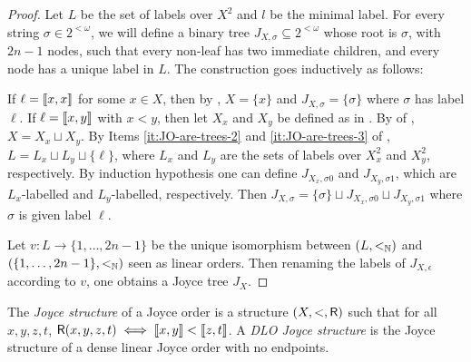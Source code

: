 \begin{proof}
	


Let $L$ be the set of labels over $X^2$ and $l$ be the minimal label. For every string $\sigma \in 2^{<\omega}$, we will define a binary tree $J_{X, \sigma} \subseteq 2^{<\omega}$ whose root is $\sigma$, with $2n-1$ nodes, such that every non-leaf has two immediate children, and every node has a unique label in $L$. The construction goes inductively as follows:

If $\ell = \llbracket x , x \rrbracket$ for some $x \in X$, then by , $X = \{x\}$ and $J_{X,\sigma} = \{\sigma\}$ where $\sigma$ has label $\ell$.
If $\ell = \llbracket x , y \rrbracket$ with $x < y$, then let $X_x$ and $X_y$ be defined as in . By  of , $X = X_x \sqcup X_y$.
By Items \ref{it:JO-are-trees-2} and \ref{it:JO-are-trees-3}
of , $L = L_x \sqcup L_y \sqcup \{\ell\}$, where $L_x$ and $L_y$ are the sets of labels over $X_x^2$ and $X_y^2$, respectively.
By induction hypothesis one can define $J_{X_x, \sigma 0}$ and $J_{X_y, \sigma 1}$, which are $L_x$-labelled and $L_y$-labelled, respectively.
Then $J_{X, \sigma} = \{\sigma\} \sqcup J_{X_x, \sigma 0} \sqcup J_{X_y, \sigma 1}$ where $\sigma$ is given label $\ell$.

Let $v: L \to \{1, \dots, 2n-1\}$ be the unique isomorphism between $(L, <_{\mathbb{N}})$ and $(\{1, \dots, 2n-1\}, <_{\mathbb{N}})$ seen as linear orders. Then renaming the labels of $J_{X, \epsilon}$ according to $v$, one obtains a Joyce tree $J_X$. 
\end{proof}



\begin{definition}
  The \emph{Joyce structure} of a Joyce order is a structure \mbox{$(X, <, \mathsf{R})$} such that for all $x,y,z,t$, $\mathsf{R}(x,y,z,t)\iff\llbracket x , y \rrbracket<\llbracket z , t \rrbracket$. A \emph{DLO Joyce structure} is the Joyce structure of a dense linear Joyce order with no endpoints.
\end{definition}

